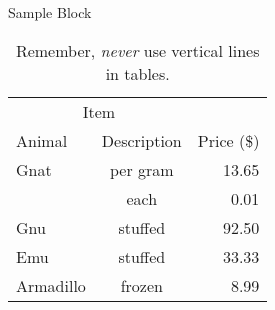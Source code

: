 \documentclass[final]{beamer}
\newlength{\onecolwid}
\newlength{\twocolwid}
\begin{document}
\begin{frame}[t]
\begin{columns}[t]
\begin{column}{\onecolwid}
\begin{block}{Sample Block}
\begin{table}[htbp]
   \centering
   \begin{tabular}{@{} lcr @{}} %
      \toprule
      \multicolumn{2}{c}{Item} \\
      \cmidrule(r){1-2} %
      Animal    & Description & Price (\$)\\
      \midrule
      Gnat      & per gram & 13.65 \\
                & each     &  0.01 \\
      Gnu       & stuffed  & 92.50 \\
      Emu       & stuffed  & 33.33 \\
      Armadillo & frozen   &  8.99 \\
      \bottomrule
   \end{tabular}
   \caption{Remember, \emph{never} use vertical lines in tables.}
   \label{tab:booktabs}
\end{table}
	
      \end{block}

	\end{column}

\end{columns}
\end{frame}
\end{document}
